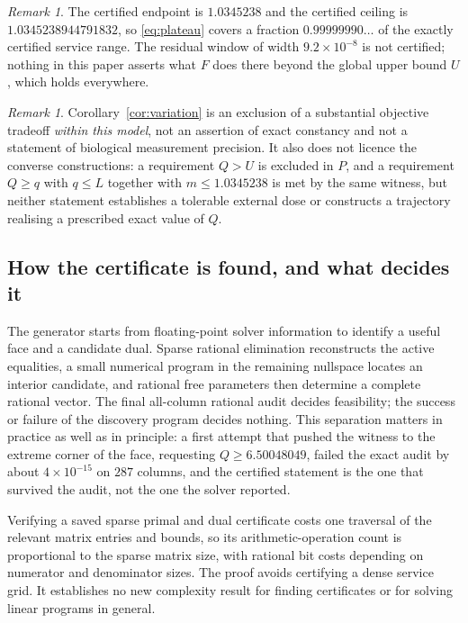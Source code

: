 \documentclass[11pt,a4paper]{article}
\theoremstyle{plain}
\theoremstyle{definition}
\theoremstyle{remark}
\newtheorem{remark}[theorem]{Remark}
\begin{document}
\begin{remark}
The certified endpoint is $1.0345238$ and the certified ceiling is
$1.0345238944791832$, so \eqref{eq:plateau} covers a fraction
$0.99999990\ldots$ of the exactly certified service range. The residual window
of width $9.2\times10^{-8}$ is not certified; nothing in this paper asserts
what $F$ does there beyond the global upper bound $U$, which holds everywhere.
\end{remark}

\begin{remark}
Corollary~\ref{cor:variation} is an exclusion of a substantial objective
tradeoff \emph{within this model}, not an assertion of exact constancy and not
a statement of biological measurement precision. It also does not licence the
converse constructions: a requirement $Q>U$ is excluded in $P$, and a
requirement $Q\ge q$ with $q\le L$ together with $m\le 1.0345238$ is met by the
same witness, but neither statement establishes a tolerable external dose or
constructs a trajectory realising a prescribed exact value of $Q$.
\end{remark}

\subsection{How the certificate is found, and what decides it}
The generator starts from floating-point solver information to identify a
useful face and a candidate dual. Sparse rational elimination reconstructs the
active equalities, a small numerical program in the remaining nullspace locates
an interior candidate, and rational free parameters then determine a complete
rational vector. The final all-column rational audit decides feasibility; the
success or failure of the discovery program decides nothing. This separation
matters in practice as well as in principle: a first attempt that pushed the
witness to the extreme corner of the face, requesting $Q\ge6.50048049$, failed
the exact audit by about $4\times10^{-15}$ on $287$ columns, and the certified
statement is the one that survived the audit, not the one the solver reported.

Verifying a saved sparse primal and dual certificate costs one traversal of the
relevant matrix entries and bounds, so its arithmetic-operation count is
proportional to the sparse matrix size, with rational bit costs depending on
numerator and denominator sizes. The proof avoids certifying a dense service
grid. It establishes no new complexity result for finding certificates or for
solving linear programs in general.
\end{document}
